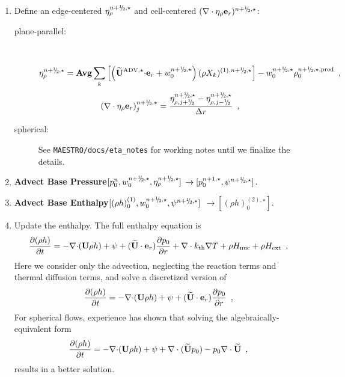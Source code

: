 \begin{description}
\begin{enumerate}
\begin{enumerate}
\end{enumerate}

\item Define an edge-centered $\etarho^{\nph,\star}$ and  cell-centered 
$(\nabla\cdot\etarho\er)^{\nph,\star}$:

\begin{description}
\item[plane-parallel:]~

\begin{equation}
 \etarho^{\nph,\star} =  {\rm {\bf Avg}} \sum_k \left[ \left(\uadvone \cdotb \er + w_0^{\nph,\star}\right) (\rho X_k)^{(1),\nph,\star} \right] - w_0^{\nph,\star} \rho_0^{\nph,\star,{\rm pred}} \enskip ,
\end{equation}
\begin{equation}
(\nabla\cdot\etarho\er)_j^{\nph,\star} = 
\frac{\eta_{\rho,j+\myhalf}^{\nph,\star}-\eta_{\rho,j-\myhalf}^{\nph,\star}}{\Delta r} \enskip ,
\end{equation}

\item[spherical:] See {\tt MAESTRO/docs/eta\_notes} for working notes until we finalize 
the details.

\end{description}

\item {\bf Advect Base Pressure}$[p_0^{n}, w_0^{\nph,\star}, \etarho^{n+\myhalf,\star}]$ 
$\rightarrow [p_0^{n+1,\star}, \psi^{\nph,\star}]$.

\item {\bf Advect Base Enthalpy}$[(\rho h)_0^{(1)}, w_0^{\nph,\star}, \psi^{\nph,\star}]$ 
$\rightarrow [(\rho h)_0^{(2),\star}]$.

\item Update the enthalpy.  The full enthalpy equation is 
  \begin{equation}
  \frac{\partial (\rho h)}{\partial t}  = - \mathbf{\nabla} \mathbf{\cdot} ({\bf U} \rho h)
+ \psi + (\widetilde{{\bf U}} \cdot \mathbf{e}_r) \frac{\partial p_0}{\partial r} + \nabla\cdot k_{\rm th}\nabla T + \rho {H_{\rm nuc}} + \rho {H_{\rm ext}} 
\enskip , \label{eq:rhohupd} 
  \end{equation}
Here we consider only the advection, neglecting the reaction terms and thermal diffusion terms,
and solve a discretized version of
  \begin{equation}
  \frac{\partial (\rho h)}{\partial t}  = - \mathbf{\nabla} \mathbf{\cdot} ({\bf U} \rho h)
+ \psi + (\widetilde{{\bf U}} \cdot \mathbf{e}_r) \frac{\partial p_0}{\partial r} 
\enskip , \label{eq:rhohupdadv} 
  \end{equation}
For spherical flows, experience has shown that solving the algebraically-equivalent form
\begin{equation}
  \frac{\partial (\rho h)}{\partial t}  = - \mathbf{\nabla} \mathbf{\cdot} ({\bf U} \rho h)
+ \psi + \nabla \cdot (\widetilde{{\bf U}} p_0) - p_0 \nabla \cdot \widetilde{{\bf U}}  
\enskip , \label{eq:rhohupdadv2} 
\end{equation}
results in a better solution.



\end{enumerate}
\end{description}
